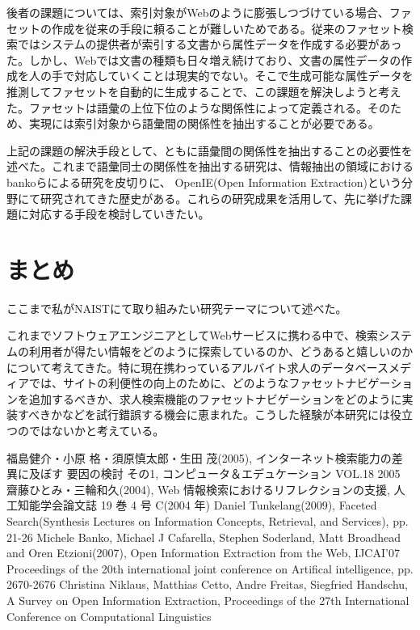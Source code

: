 \documentclass[a4j,12pt, twocolumn]{jarticle}
\begin{document}
 後者の課題については、索引対象がWebのように膨張しつづけている場合、ファセットの作成を従来の手段に頼ることが難しいためである。従来のファセット検索ではシステムの提供者が索引する文書から属性データを作成する必要があった。しかし、Webでは文書の種類も日々増え続けており、文書の属性データの作成を人の手で対応していくことは現実的でない。そこで生成可能な属性データを推測してファセットを自動的に生成することで、この課題を解決しようと考えた。ファセットは語彙の上位下位のような関係性によって定義される。そのため、実現には索引対象から語彙間の関係性を抽出することが必要である。

上記の課題の解決手段として、ともに語彙間の関係性を抽出することの必要性を述べた。これまで語彙同士の関係性を抽出する研究は、情報抽出の領域におけるbankoらによる研究\cite{banko}を皮切りに、 OpenIE(Open Information Extraction)という分野にて研究されてきた歴史がある\cite{niklaus}。これらの研究成果を活用して、先に挙げた課題に対応する手段を検討していきたい。

\section{まとめ}
ここまで私がNAISTにて取り組みたい研究テーマについて述べた。

 これまでソフトウェアエンジニアとしてWebサービスに携わる中で、検索システムの利用者が得たい情報をどのように探索しているのか、どうあると嬉しいのかについて考えてきた。特に現在携わっているアルバイト求人のデータベースメディアでは、サイトの利便性の向上のために、どのようなファセットナビゲーションを追加するべきか、求人検索機能のファセットナビゲーションをどのように実装すべきかなどを試行錯誤する機会に恵まれた。こうした経験が本研究には役立つのではないかと考えている。

\begin{thebibliography}{9}
   福島健介・小原 格・須原慎太郎・生田 茂(2005), インターネット検索能力の差異に及ぼす 要因の検討 その1, コンピュータ＆エデュケーション VOL.18 2005
   齋藤ひとみ・三輪和久(2004),  Web 情報検索におけるリフレクションの支援, 人工知能学会論文誌 19 巻 4 号 C(2004 年)
  Daniel Tunkelang(2009), Faceted Search(Synthesis Lectures on Information Concepts, Retrieval, and Services), pp. 21-26
  Michele Banko, Michael J Cafarella, Stephen Soderland, Matt Broadhead and Oren Etzioni(2007), Open Information Extraction from the Web, IJCAI'07 Proceedings of the 20th international joint conference on Artifical intelligence, pp. 2670-2676 
  Christina Niklaus, Matthias Cetto, Andre Freitas, Siegfried Handschu, A Survey on Open Information Extraction, Proceedings of the 27th International Conference on Computational Linguistics
\end{thebibliography}
\end{document}
